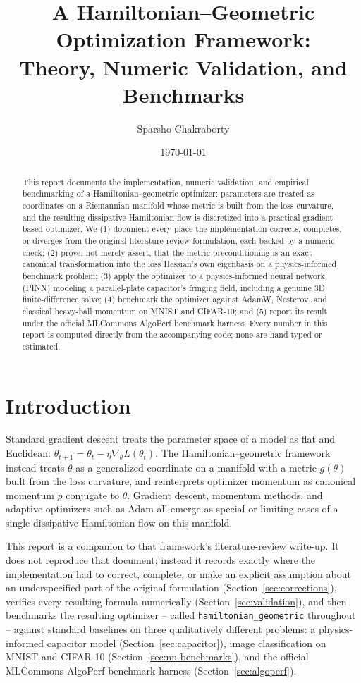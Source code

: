 \documentclass[11pt]{article}
\title{A Hamiltonian--Geometric Optimization Framework:\\
\large Theory, Numeric Validation, and Benchmarks}
\author{Sparsho Chakraborty}
\date{\today}
\begin{document}
\maketitle

\begin{abstract}
This report documents the implementation, numeric validation, and empirical benchmarking of
a Hamiltonian--geometric optimizer: parameters are treated as coordinates on a Riemannian
manifold whose metric is built from the loss curvature, and the resulting dissipative
Hamiltonian flow is discretized into a practical gradient-based optimizer. We (1) document
every place the implementation corrects, completes, or diverges from the original
literature-review formulation, each backed by a numeric check; (2) prove, not merely assert,
that the metric preconditioning is an exact canonical transformation into the loss Hessian's
own eigenbasis on a physics-informed benchmark problem; (3) apply the optimizer to a
physics-informed neural network (PINN) modeling a parallel-plate capacitor's fringing field,
including a genuine 3D finite-difference solve; (4) benchmark the optimizer against AdamW,
Nesterov, and classical heavy-ball momentum on MNIST and CIFAR-10; and (5) report its result
under the official MLCommons AlgoPerf benchmark harness. Every number in this report is
computed directly from the accompanying code; none are hand-typed or estimated.
\end{abstract}

\tableofcontents

\section{Introduction}

Standard gradient descent treats the parameter space of a model as flat and Euclidean:
$\theta_{t+1} = \theta_t - \eta \nabla_\theta L(\theta_t)$. The Hamiltonian--geometric
framework instead treats $\theta$ as a generalized coordinate on a manifold with a metric
$g(\theta)$ built from the loss curvature, and reinterprets optimizer momentum as canonical
momentum $p$ conjugate to $\theta$. Gradient descent, momentum methods, and adaptive
optimizers such as Adam all emerge as special or limiting cases of a single dissipative
Hamiltonian flow on this manifold.

This report is a companion to that framework's literature-review write-up. It does not
reproduce that document; instead it records exactly where the implementation had to correct,
complete, or make an explicit assumption about an underspecified part of the original
formulation (Section~\ref{sec:corrections}), verifies every resulting formula numerically
(Section~\ref{sec:validation}), and then benchmarks the resulting optimizer -- called
\texttt{hamiltonian\_geometric} throughout -- against standard baselines on three
qualitatively different problems: a physics-informed capacitor model (Section~\ref{sec:capacitor}),
image classification on MNIST and CIFAR-10 (Section~\ref{sec:nn-benchmarks}), and the official
MLCommons AlgoPerf benchmark harness (Section~\ref{sec:algoperf}).
\end{document}
